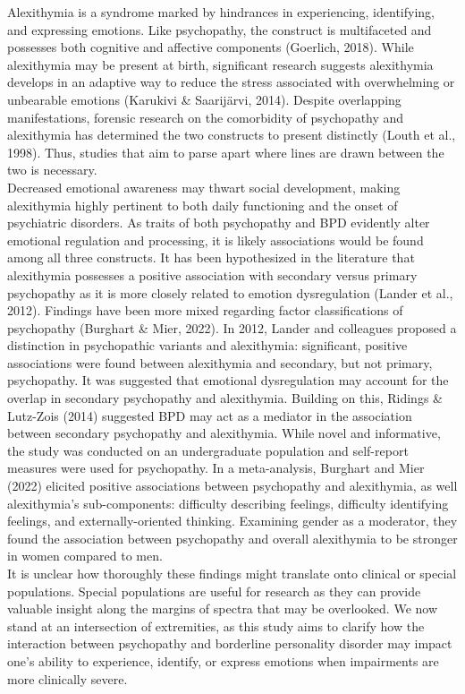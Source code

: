 \documentclass[
  man,floatsintext]{apa7}
\begin{document}
Alexithymia is a syndrome marked by hindrances in experiencing, identifying, and expressing emotions. Like psychopathy, the construct is multifaceted and possesses both cognitive and affective components (Goerlich, 2018). While alexithymia may be present at birth, significant research suggests alexithymia develops in an adaptive way to reduce the stress associated with overwhelming or unbearable emotions (Karukivi \& Saarijärvi, 2014). Despite overlapping manifestations, forensic research on the comorbidity of psychopathy and alexithymia has determined the two constructs to present distinctly (Louth et al., 1998). Thus, studies that aim to parse apart where lines are drawn between the two is necessary.\\
Decreased emotional awareness may thwart social development, making alexithymia highly pertinent to both daily functioning and the onset of psychiatric disorders. As traits of both psychopathy and BPD evidently alter emotional regulation and processing, it is likely associations would be found among all three constructs. It has been hypothesized in the literature that alexithymia possesses a positive association with secondary versus primary psychopathy as it is more closely related to emotion dysregulation (Lander et al., 2012). Findings have been more mixed regarding factor classifications of psychopathy (Burghart \& Mier, 2022). In 2012, Lander and colleagues proposed a distinction in psychopathic variants and alexithymia: significant, positive associations were found between alexithymia and secondary, but not primary, psychopathy. It was suggested that emotional dysregulation may account for the overlap in secondary psychopathy and alexithymia. Building on this, Ridings \& Lutz-Zois (2014) suggested BPD may act as a mediator in the association between secondary psychopathy and alexithymia. While novel and informative, the study was conducted on an undergraduate population and self-report measures were used for psychopathy. In a meta-analysis, Burghart and Mier (2022) elicited positive associations between psychopathy and alexithymia, as well alexithymia's sub-components: difficulty describing feelings, difficulty identifying feelings, and externally-oriented thinking. Examining gender as a moderator, they found the association between psychopathy and overall alexithymia to be stronger in women compared to men.\\
It is unclear how thoroughly these findings might translate onto clinical or special populations. Special populations are useful for research as they can provide valuable insight along the margins of spectra that may be overlooked. We now stand at an intersection of extremities, as this study aims to clarify how the interaction between psychopathy and borderline personality disorder may impact one's ability to experience, identify, or express emotions when impairments are more clinically severe.
\end{document}
